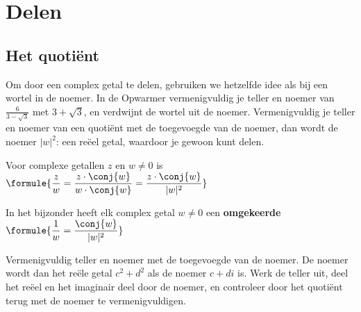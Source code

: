\begin{oefeningen}
\end{oefeningen}

\section{Delen}

\subsection{Het quotiënt}

Om door een complex getal te delen, gebruiken we hetzelfde idee als bij een wortel in de noemer. In de Opwarmer vermenigvuldig je teller en noemer van $\frac{6}{3 - \sqrt3}$ met $3 + \sqrt3$, en verdwijnt de wortel uit de noemer. Vermenigvuldig je teller en noemer van een quotiënt met de toegevoegde van de noemer, dan wordt de noemer $|w|^2$: een reëel getal, waardoor je gewoon kunt delen.

\begin{theorie}
Voor complexe getallen $z$ en $w \neq 0$ is \quad $\formule{\dfrac{z}{w} = \dfrac{z \cdot \conj{w}}{w \cdot \conj{w}} = \dfrac{z \cdot \conj{w}}{|w|^2}}$

\vspace{1mm}
In het bijzonder heeft elk complex getal $w \neq 0$ een \textbf{\textcolor{accent}{omgekeerde}} \quad $\formule{\dfrac{1}{w} = \dfrac{\conj{w}}{|w|^2}}$
\end{theorie}


\begin{werkwijze}
Vermenigvuldig teller en noemer met de toegevoegde van de noemer. De noemer wordt dan het reële getal $c^2 + d^2$ als de noemer $c + di$ is. Werk de teller uit, deel het reëel en het imaginair deel door de noemer, en controleer door het quotiënt terug met de noemer te vermenigvuldigen.
\end{werkwijze}

